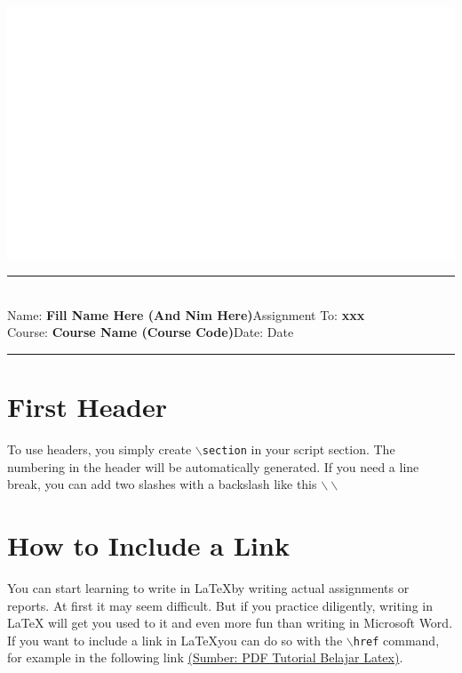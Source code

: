 \documentclass[11pt,a4paper]{article}
\newcommand{\student}{\textbf{Fill Name Here (And Nim Here)}}
\newcommand{\course}{\textbf{Course Name (Course Code)}}
\newcommand{\assignment}{\textbf{xxx}}
\begin{document}
\thispagestyle{empty}
\begin{center}
	\includegraphics[scale = 0.15]{Figure/ifitera-header.png}
	\vspace{0.1cm}
\end{center}
\noindent
\rule{17cm}{0.2cm}\\[0.3cm]
Name: \student \hfill Assignment To: \assignment\\[0.1cm]
Course: \course \hfill Date: Date\\
\rule{17cm}{0.05cm}
\vspace{0.1cm}

\pagebreak

\tableofcontents
\pagebreak

\section{First Header}
    To use headers, you simply create $\backslash${\tt{section}} in your script section. The numbering in the header will be automatically generated. If you need a line break, you can add two slashes with a backslash like this $\backslash\backslash$

\section{How to Include a Link}
    You can start learning to write in \LaTeX by writing actual assignments or reports. At first it may seem difficult. But if you practice diligently, writing in LaTeX will get you used to it and even more fun than writing in Microsoft Word.\\
    If you want to include a link in \LaTeX you can do so with the $\backslash${\tt{href}} command, for example in the following link \href{http://aldi_tob_2000.staff.gunadarma.ac.id/Downloads/files/17359/Membuat+dokumen+dengan+latex.pdf}{(Sumber: PDF Tutorial Belajar Latex)}.
    
\end{document}
